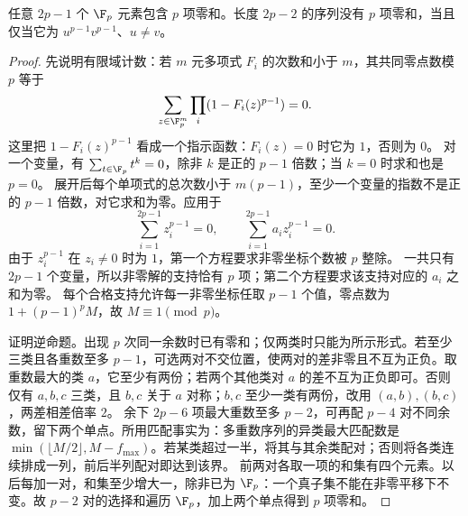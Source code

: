 \begin{lemma}[素数零和选择及逆边界]\label{lem:egz}
任意 $2p-1$ 个 $\F_p$ 元素包含 $p$ 项零和。长度 $2p-2$ 的序列没有 $p$ 项零和，当且仅当它为 $u^{p-1}v^{p-1}$、$u\ne v$。
\end{lemma}
\begin{proof}
先说明有限域计数：若 $m$ 元多项式 $F_i$ 的次数和小于 $m$，其共同零点数模 $p$ 等于
\[\sum_{z\in\F_p^m}\prod_i(1-F_i(z)^{p-1})=0.
\]
这里把 $1-F_i(z)^{p-1}$ 看成一个指示函数：$F_i(z)=0$ 时它为 $1$，否则为 $0$。
对一个变量，有 $\sum_{t\in\F_p}t^k=0$，除非 $k$ 是正的 $p-1$ 倍数；当 $k=0$ 时求和也是 $p=0$。
展开后每个单项式的总次数小于 $m(p-1)$，至少一个变量的指数不是正的 $p-1$ 倍数，对它求和为零。应用于
\[\sum_{i=1}^{2p-1}z_i^{p-1}=0,\qquad
\sum_{i=1}^{2p-1}a_i z_i^{p-1}=0.
\]
由于 $z_i^{p-1}$ 在 $z_i\ne0$ 时为 $1$，第一个方程要求非零坐标个数被 $p$ 整除。
一共只有 $2p-1$ 个变量，所以非零解的支持恰有 $p$ 项；第二个方程要求该支持对应的 $a_i$ 之和为零。
每个合格支持允许每一非零坐标任取 $p-1$ 个值，零点数为 $1+(p-1)^p M$，故 $M\equiv1\pmod p$。

证明逆命题。出现 $p$ 次同一余数时已有零和；仅两类时只能为所示形式。若至少三类且各重数至多 $p-1$，可选两对不交位置，使两对的差非零且不互为正负。取重数最大的类 $a$，它至少有两份；若两个其他类对 $a$ 的差不互为正负即可。否则仅有 $a,b,c$ 三类，且 $b,c$ 关于 $a$ 对称；$b,c$ 至少一类有两份，改用 $(a,b),(b,c)$，两差相差倍率 $2$。
余下 $2p-6$ 项最大重数至多 $p-2$，可再配 $p-4$ 对不同余数，留下两个单点。所用匹配事实为：多重数序列的异类最大匹配数是 $\min(\lfloor M/2\rfloor,M-f_{\max})$。若某类超过一半，将其与其余类配对；否则将各类连续排成一列，前后半列配对即达到该界。
前两对各取一项的和集有四个元素。以后每加一对，和集至少增大一，除非已为 $\F_p$：一个真子集不能在非零平移下不变。故 $p-2$ 对的选择和遍历 $\F_p$，加上两个单点得到 $p$ 项零和。
\end{proof}

